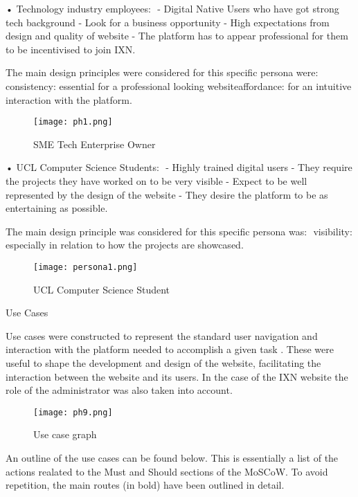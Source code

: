 • Technology industry employees: ​ - Digital Native Users who have got
strong tech background​ - Look for a business opportunity​ - High
expectations from design and quality of website​ - The platform has to
appear professional for them to be incentivised to join IXN​.

The main design principles were considered for this specific persona
were: ​ consistency: essential for a professional looking website​
affordance: for an intuitive interaction with the platform. ​

\begin{figure}[H]
      \centering
      \texttt{[image: ph1.png]}
      \caption{SME Tech Enterprise Owner}
\end{figure}

• UCL Computer Science Students: ​ - Highly trained digital users​ -
They require the projects they have worked on to be very visible​ -
Expect to be well represented by the design of the website​ - They
desire the platform to be as entertaining as possible. ​

The main design principle was considered for this specific persona was:
​ visibility: especially in relation to how the projects are showcased.
​

\begin{figure}[H]
      \centering
      \texttt{[image: persona1.png]}
      \caption{UCL Computer Science Student}
\end{figure}

Use Cases

Use cases were constructed to represent the standard user navigation and
interaction with the platform needed to accomplish a given task
\cite{g3}. These were useful to shape the development and design of the
website, facilitating the interaction between the website and its users.
In the case of the IXN website the role of the administrator was also
taken into account.

\begin{figure}[H]
      \centering
      \texttt{[image: ph9.png]}
      \caption{Use case graph}
\end{figure}

An outline of the use cases can be found below. This is essentially a
list of the actions realated to the Must and Should sections of the
MoSCoW. To avoid repetition, the main routes (in bold) have been
outlined in detail.

